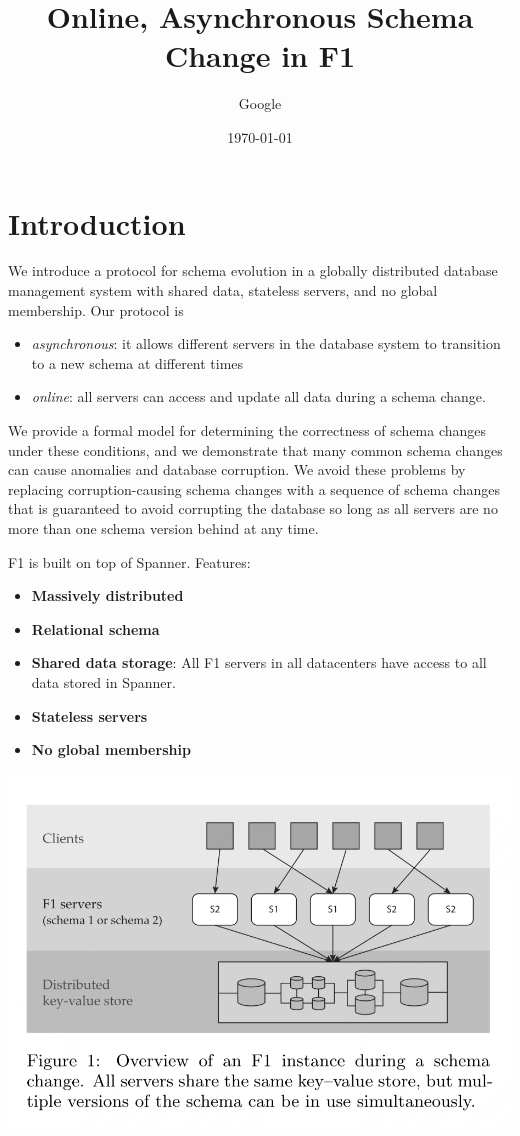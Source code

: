 \documentclass[11pt]{article}
\author{Google}
\date{\today}
\title{Online, Asynchronous Schema Change in F1}
\begin{document}
\maketitle
\section{Introduction}
\label{sec:org912ad9a}
We introduce a protocol for schema evolution in a globally distributed database management system with
shared data, stateless servers, and no global membership. Our protocol is
\begin{itemize}
\item \emph{asynchronous}: it allows different servers in the database system to transition to a new schema at
different times
\item \emph{online}: all servers can access and update all data during a schema change.
\end{itemize}

We provide a formal model for determining the correctness of schema changes under these conditions,
and we demonstrate that many common schema changes can cause anomalies and database corruption. We
avoid these problems by replacing corruption-causing schema changes with a sequence of schema changes
that is guaranteed to avoid corrupting the database so long as all servers are no more than one schema
version behind at any time.


F1 is built on top of Spanner. Features:
\begin{itemize}
\item \textbf{Massively distributed}
\item \textbf{Relational schema}
\item \textbf{Shared data storage}: All F1 servers in all datacenters have access to all data stored in Spanner.
\item \textbf{Stateless servers}
\item \textbf{No global membership}
\end{itemize}


\begin{center}
\includegraphics[width=.88\textwidth]{../../images/papers/27.png}
\label{}
\end{center}
\end{document}
